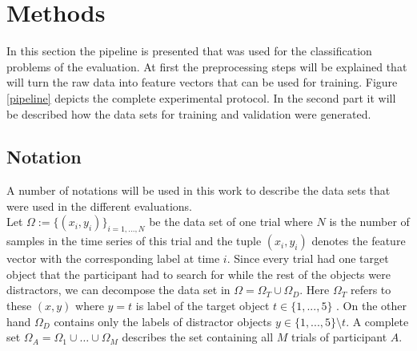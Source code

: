 \section{Methods}
In this section the pipeline is presented that was used for the classification problems of the evaluation. At first the preprocessing steps will be explained that will turn the raw data into feature vectors that can be used for training. Figure \ref{pipeline} depicts the complete experimental protocol. In the second part it will be described how the data sets for training and validation were generated.

\subsection{Notation}
A number of notations will be used in this work to describe the data sets that were used in the different evaluations. \\
Let $ \Omega := \{(x_{i},y_{i})\}_{i=1,...,N} $ be the data set of one trial where $ N $ is the number of samples in the time series of this trial and the tuple $ (x_{i},y_{i}) $ denotes the feature vector with the corresponding label at time $ i $. Since every trial had one target object that the participant had to search for while the rest of the objects were distractors, we can decompose the data set in $ \Omega = \Omega_{T} \cup \Omega_{D} $. Here $ \Omega_{T} $ refers to these $ (x,y) $ where $ y=t $ is label of the target object $ t \in \{1,...,5\} $ . On the other hand $ \Omega_{D} $ contains only the labels of distractor objects $ y \in \{1,...,5\}\setminus t $. A complete set $ \Omega_{A} = \Omega_{1} \cup \hdots \cup \Omega_{M} $ describes the set containing all $ M $ trials of participant $ A $.

